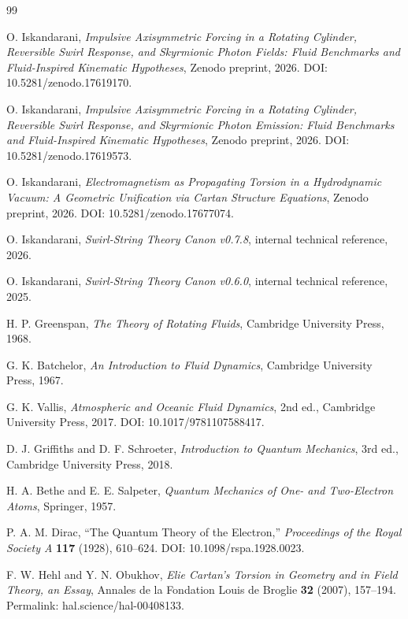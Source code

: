 \documentclass[11pt,a4paper]{article}
\begin{document}
\begin{thebibliography}{99}

O. Iskandarani,
\textit{Impulsive Axisymmetric Forcing in a Rotating Cylinder, Reversible Swirl Response, and Skyrmionic Photon Fields: Fluid Benchmarks and Fluid-Inspired Kinematic Hypotheses},
Zenodo preprint, 2026.
DOI: 10.5281/zenodo.17619170.

O. Iskandarani,
\textit{Impulsive Axisymmetric Forcing in a Rotating Cylinder, Reversible Swirl Response, and Skyrmionic Photon Emission: Fluid Benchmarks and Fluid-Inspired Kinematic Hypotheses},
Zenodo preprint, 2026.
DOI: 10.5281/zenodo.17619573.

O. Iskandarani,
\textit{Electromagnetism as Propagating Torsion in a Hydrodynamic Vacuum: A Geometric Unification via Cartan Structure Equations},
Zenodo preprint, 2026.
DOI: 10.5281/zenodo.17677074.

O. Iskandarani,
\textit{Swirl-String Theory Canon v0.7.8},
internal technical reference, 2026.

O. Iskandarani,
\textit{Swirl-String Theory Canon v0.6.0},
internal technical reference, 2025.

H. P. Greenspan,
\textit{The Theory of Rotating Fluids},
Cambridge University Press, 1968.

G. K. Batchelor,
\textit{An Introduction to Fluid Dynamics},
Cambridge University Press, 1967.

G. K. Vallis,
\textit{Atmospheric and Oceanic Fluid Dynamics},
2nd ed., Cambridge University Press, 2017.
DOI: 10.1017/9781107588417.

D. J. Griffiths and D. F. Schroeter,
\textit{Introduction to Quantum Mechanics},
3rd ed., Cambridge University Press, 2018.

H. A. Bethe and E. E. Salpeter,
\textit{Quantum Mechanics of One- and Two-Electron Atoms},
Springer, 1957.

P. A. M. Dirac,
``The Quantum Theory of the Electron,''
\textit{Proceedings of the Royal Society A} \textbf{117} (1928), 610--624.
DOI: 10.1098/rspa.1928.0023.

F. W. Hehl and Y. N. Obukhov,
\textit{Elie Cartan's Torsion in Geometry and in Field Theory, an Essay},
Annales de la Fondation Louis de Broglie \textbf{32} (2007), 157--194.
Permalink: hal.science/hal-00408133.

\end{thebibliography}
\end{document}

